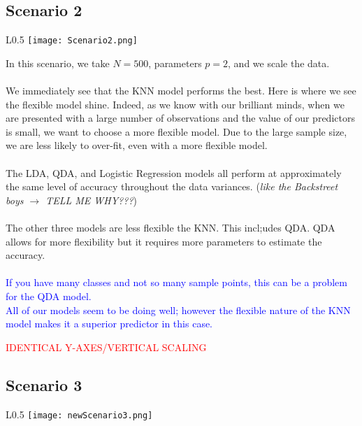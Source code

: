 \documentclass[11pt, oneside]{article}
\begin{document}
\subsection*{Scenario 2}
\begin{wrapfigure}[]{L}{0.5\textwidth}
\vspace{-0.55cm}
\texttt{[image: Scenario2.png]}
\vspace{-.55cm}
\end{wrapfigure}
In this scenario, we take $N=500$, parameters $p=2$, and we scale the data.\\
\\
We immediately see that the KNN model performs the best. Here is where we see the flexible model shine. Indeed, as we know with our brilliant minds, when we are presented with a large number of observations and the value of our predictors is small, we want to choose a more flexible model. Due to the large sample size, we are less likely to over-fit, even with a more flexible model.\\
\\
The LDA, QDA, and Logistic Regression models all perform at approximately the same level of accuracy throughout the data variances. (\emph{like the Backstreet boys $\rightarrow$ TELL ME WHY???})\\
\\
The other three models are less flexible the KNN. This incl;udes QDA. QDA allows for more flexibility but it requires more parameters to estimate the accuracy.\\
\\
\textcolor{blue}{ If you have many classes and not so many sample points, this can be a problem for the QDA model.}\\

\textcolor{blue}{All of our models seem to be doing well; however the flexible nature of the KNN model makes it a superior predictor in this case.}

\textcolor{red}{IDENTICAL Y-AXES/VERTICAL SCALING}



\subsection*{Scenario 3}
\begin{wrapfigure}[]{L}{0.5\textwidth}
\vspace{-0.55cm}
\texttt{[image: newScenario3.png]}
\vspace{-1.0cm}
\end{wrapfigure}
\end{document}
